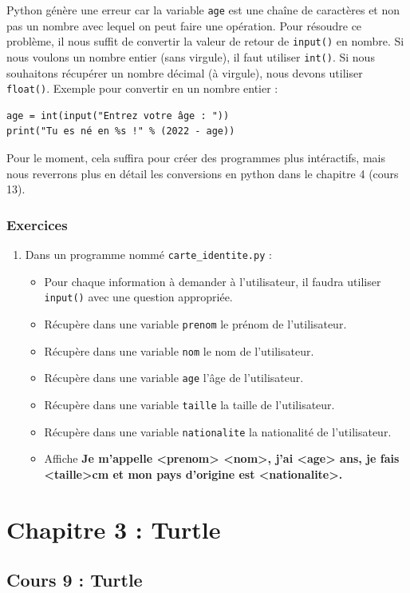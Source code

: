 \documentclass[11pt]{article}
\begin{document}
Python génère une erreur car la variable \texttt{age} est une chaîne de caractères et non pas un nombre avec lequel on peut faire une opération. Pour résoudre ce problème, il nous suffit de convertir la valeur de retour de \texttt{input()} en nombre. Si nous voulons un nombre entier (sans virgule), il faut utiliser \texttt{int()}. Si nous souhaitons récupérer un nombre décimal (à virgule), nous devons utiliser \texttt{float()}.
Exemple pour convertir en un nombre entier :
\begin{verbatim}
age = int(input("Entrez votre âge : "))
print("Tu es né en %s !" % (2022 - age))
\end{verbatim}

Pour le moment, cela suffira pour créer des programmes plus intéractifs, mais nous reverrons plus en détail les conversions en python dans le chapitre 4 (cours 13).
\subsubsection*{Exercices}
\label{sec:org1b81bf4}
\begin{enumerate}
\item Dans un programme nommé \texttt{carte\_identite.py} :
\begin{itemize}
\item Pour chaque information à demander à l'utilisateur, il faudra utiliser \texttt{input()} avec une question appropriée.
\item Récupère dans une variable \texttt{prenom} le prénom de l'utilisateur.
\item Récupère dans une variable \texttt{nom} le nom de l'utilisateur.
\item Récupère dans une variable \texttt{age} l'âge de l'utilisateur.
\item Récupère dans une variable \texttt{taille} la taille de l'utilisateur.
\item Récupère dans une variable \texttt{nationalite} la nationalité de l'utilisateur.
\item Affiche \textbf{\og Je m'appelle <prenom> <nom>, j'ai <age> ans, je fais <taille>cm et mon pays d'origine est <nationalite>.\fg{}}
\end{itemize}
\end{enumerate}

\section*{Chapitre 3 : Turtle}
\label{chapitre3}
\subsection*{Cours 9 : Turtle}
\label{chapitre3_cours9}
\end{document}
